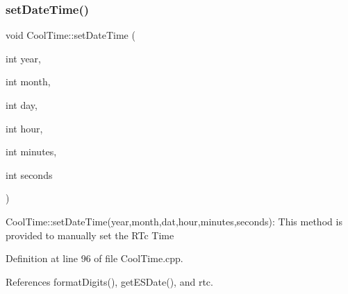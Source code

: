 \subsubsection{\texorpdfstring{set\+Date\+Time()}{setDateTime()}}
{\footnotesize\ttfamily void Cool\+Time\+::set\+Date\+Time (\begin{DoxyParamCaption}\item[{int}]{year,  }\item[{int}]{month,  }\item[{int}]{day,  }\item[{int}]{hour,  }\item[{int}]{minutes,  }\item[{int}]{seconds }\end{DoxyParamCaption})}

Cool\+Time\+::set\+Date\+Time(year,month,dat,hour,minutes,seconds)\+: This method is provided to manually set the R\+Tc Time 

Definition at line 96 of file Cool\+Time.\+cpp.



References format\+Digits(), get\+E\+S\+Date(), and rtc.


